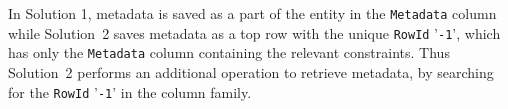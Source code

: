 
In Solution 1,   metadata is saved as a part of the entity in the
\texttt{Metadata} column while Solution~2 saves metadata as a top row with the
unique \texttt{RowId} '\texttt{-1}',  which has only the \texttt{Metadata}
column containing the relevant constraints. 
Thus Solution~2 performs an additional operation to retrieve metadata,  by
searching  for the \texttt{RowId} '\texttt{-1}' in the column family.  
